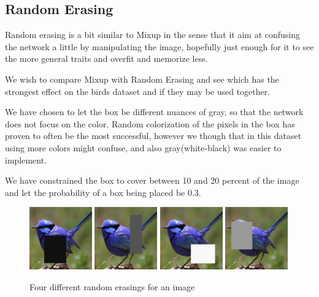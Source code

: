 \documentclass{article}
\begin{document}
\subsection{Random Erasing}

Random erasing is a bit similar to Mixup in the sense that it aim at confusing the network a little by manipulating the image, hopefully just enough for it to see the more general traits and overfit and memorize less.

We wish to compare Mixup with Random Erasing and see which has the strongest effect on the birds dataset and if they may be used together.

We have chosen to let the box be different nuances of gray, so that the network does not focus on the color. Random colorization of the pixels in the box has proven to often be the most successful, however we though that in this dataset using more colors might confuse, and also gray(white-black) was easier to implement.

We have constrained the box to cover between 10 and 20 percent of the image and let the probability of a box being placed be 0.3. 

\begin{figure}[h]
	\includegraphics[width=0.24\textwidth]{re1.jpeg}
	\includegraphics[width=0.24\textwidth]{re2.jpeg}
	\includegraphics[width=0.24\textwidth]{re3.jpeg}
	\includegraphics[width=0.24\textwidth]{re4.jpeg}
	\caption{Four different random erasings for an image}
\end{figure}
\end{document}
